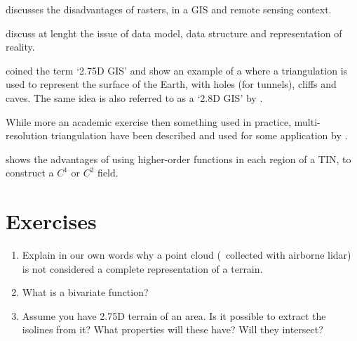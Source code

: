 \citet{Fisher97} discusses the disadvantages of rasters, in a GIS and remote sensing context.

\citet{Frank92,Goodchild92a} discuss at lenght the issue of data model, data structure and representation of reality. 

\citet{Tse04} coined the term `2.75D GIS' and show an example of a where a triangulation is used to represent the surface of the Earth, with holes (for tunnels), cliffs and caves. 
The same idea is also referred to as a `2.8D GIS' by \citet{Groger05}.

While more an academic exercise then something used in practice, multi-resolution triangulation have been described and used for some application by \citet{DeFloriani02}.

\citet{Akima78} shows the advantages of using higher-order functions in each region of a TIN, to construct a $C^1$ or $C^2$ field. 




%
\section{Exercises}

\begin{enumerate}
  \item Explain in our own words why a point cloud (\eg\ collected with airborne lidar) is not considered a complete representation of a terrain.
  \item What is a bivariate function? 
  \item Assume you have 2.75D terrain of an area. Is it possible to extract the isolines from it? What properties will these have? Will they intersect?
\end{enumerate}
